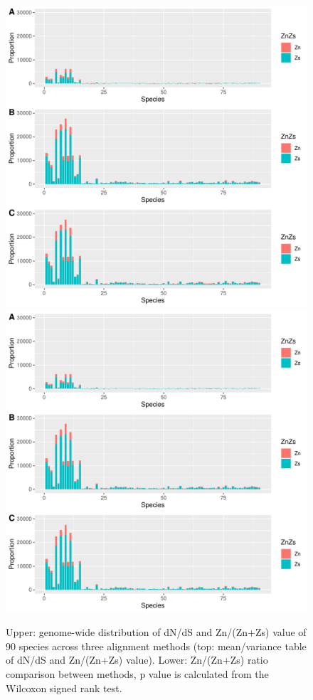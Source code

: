 \begin{figure}[H]
    \vspace*{-0.5in}
     \centering
     \begin{minipage}[t]{1\textwidth}
     \centering
     \includegraphics[page=2,width=0.7\linewidth,height=0.6\linewidth]{Fig6.pdf}
     \includegraphics[page=3,width=0.7\linewidth,height=0.6\linewidth]{Fig6.pdf}
     { {Upper: genome-wide distribution of dN/dS and Zn/(Zn+Zs) value of 90 species across three alignment methods (top: mean/variance table of dN/dS and Zn/(Zn+Zs) value). Lower: Zn/(Zn+Zs) ratio comparison between methods, p value is calculated from the Wilcoxon signed rank test.}
     \par}
     \end{minipage}
\end{figure}

